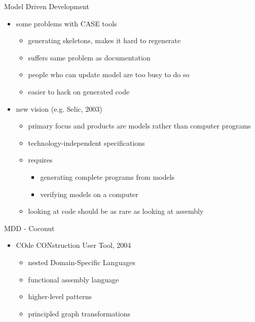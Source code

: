 \documentclass[presentation]{beamer}
\begin{document}
\begin{frame}{Model Driven Development}
\begin{itemize}
\item some problems with CASE tools
  \begin{itemize}
  \item generating skeletons, makes it hard to regenerate
  \item suffers same problem as documentation
  \item people who can update model are too busy to do so
  \item easier to hack on generated code
  \end{itemize}
\item new vision (e.g. Selic, 2003)
  \begin{itemize}
  \item primary focus and products are models rather than computer programs
  \item technology-independent specifications
  \item requires
  \begin{itemize}
  \item generating complete programs from models
  \item verifying models on a computer
  \end{itemize}
  \item looking at code should be as rare as looking at assembly
  \end{itemize}
\end{itemize}
\end{frame}
\begin{frame}{MDD - Coconut}
\begin{itemize}
\item COde CONstruction User Tool, 2004
  \begin{itemize}
  \item nested Domain-Specific Languages
  \item functional assembly language
  \item higher-level patterns
  \item principled graph transformations
  \end{itemize}
\end{itemize}
\end{frame}
\end{document}
